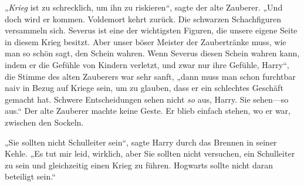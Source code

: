 „\emph{Krieg} ist zu schrecklich, um ihn zu riskieren“, sagte der alte Zauberer. „Und doch wird er kommen. Voldemort kehrt zurück. Die schwarzen Schachfiguren versammeln sich. Severus ist eine der wichtigsten Figuren, die unsere eigene Seite in diesem Krieg besitzt. Aber unser böser Meister der Zaubertränke muss, wie man so schön sagt, den Schein wahren. Wenn Severus diesen Schein wahren kann, indem er die Gefühle von Kindern verletzt, und zwar nur ihre Gefühle, Harry“, die Stimme des alten Zauberers war sehr sanft, „dann muss man schon furchtbar naiv in Bezug auf Kriege sein, um zu glauben, dass er ein schlechtes Geschäft gemacht hat. Schwere Entscheidungen sehen nicht \emph{so} aus, Harry. Sie sehen—so aus.“ Der alte Zauberer machte keine Geste. Er blieb einfach stehen, wo er war, zwischen den Sockeln.

„Sie sollten nicht Schulleiter sein“, sagte Harry durch das Brennen in seiner Kehle. „Es tut mir leid, wirklich, aber Sie sollten nicht versuchen, ein Schulleiter zu sein und gleichzeitig einen Krieg zu führen. Hogwarts sollte nicht daran beteiligt sein.“

